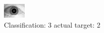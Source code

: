 \begin{figure}[h!]
\begin{center}
\includegraphics[width=0.60\columnwidth]{figures/ID1620_class_3_target_2.png}
\end{center}
\caption{ Classification: 3 actual target: 2}
\label{fig:ID1620_class_3_target_2}
\end{figure}

